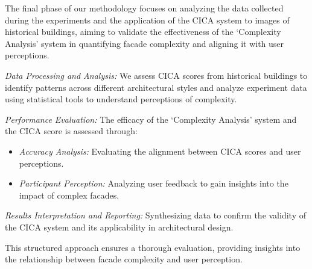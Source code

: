 %    

The final phase of our methodology focuses on analyzing the data collected during the experiments and the application of the CICA system to images of historical buildings, aiming to validate the effectiveness of the `Complexity Analysis' system in quantifying facade complexity and aligning it with user perceptions.

\textit{Data Processing and Analysis:} We assess CICA scores from historical buildings to identify patterns across different architectural styles and analyze experiment data using statistical tools to understand perceptions of complexity.

\textit{Performance Evaluation:} The efficacy of the `Complexity Analysis' system and the CICA score is assessed through:
\begin{itemize}
    \item \textit{Accuracy Analysis:} Evaluating the alignment between CICA scores and user perceptions.
    \item \textit{Participant Perception:} Analyzing user feedback to gain insights into the impact of complex facades.
\end{itemize}

\textit{Results Interpretation and Reporting:} Synthesizing data to confirm the validity of the CICA system and its applicability in architectural design.

This structured approach ensures a thorough evaluation, providing insights into the relationship between facade complexity and user perception.


